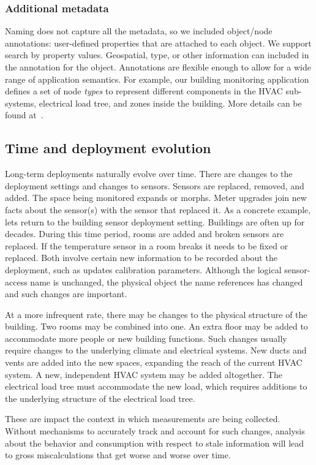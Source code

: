 \subsubsection{Additional metadata}
Naming does not capture all the metadata, so we included object/node annotations: user-defined properties that are attached to each object.
We support search by property values.   Geospatial, type, or other information can included in the annotation for the object.  Annotations are
flexible enough to allow for a wide range of application semantics.  For example, our building monitoring application defines a set of node
\emph{types} to represent different components in the HVAC sub-systems, electrical load tree, and zones inside the building.  More
details can be found at~\cite{buildingschemas}.

\subsection{Time and deployment evolution}
\label{sec:evolution}
Long-term deployments naturally evolve over time.  There are changes to the deployment settings and changes to sensors.  Sensors are
replaced, removed, and added.  The space being monitored expands or morphs.  Meter upgrades join new facts about the sensor(s)
with the sensor that replaced it.  As a concrete example, lets return to the building sensor deployment setting.  Buildings are often up for decades. 
During this time period, rooms are added and broken sensors are replaced.  If the temperature sensor in a room breaks it needs to be 
fixed or replaced.  Both involve certain new information to be recorded about the deployment, such as updates calibration parameters.  Although
the logical sensor-access name is unchanged, the physical object the name references has changed and such changes are important.

At a more infrequent rate, there may be changes to the physical structure of the building.  Two rooms may be combined into one.  An extra floor
may be added to accommodate more people or new building functions.  Such changes usually require changes to the underlying climate and
electrical systems.  New ducts and vents are added into the new spaces, expanding the reach of the current HVAC system.  A new, independent
HVAC system may be added altogether.  The electrical load tree must accommodate the new load, which requires additions to the underlying
structure of the electrical load tree.

These are impact the context in which measurements are being collected.  Without mechanisms to accurately track and account for
such changes, analysis about the behavior and consumption with respect to stale information will lead to gross miscalculations that get worse and worse
over time.

